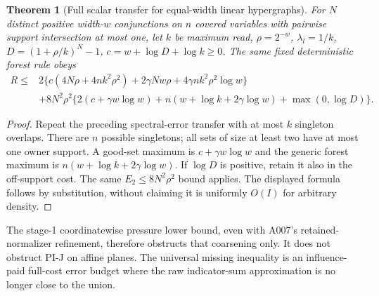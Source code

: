 \documentclass[11pt]{article}
\newtheorem{theorem}{Theorem}
\begin{document}
\begin{theorem}[Full scalar transfer for equal-width linear hypergraphs]
For $N$ distinct positive width-$w$ conjunctions on $n$ covered
variables with pairwise support intersection at most one, let $k$ be
maximum read, $\rho=2^{-w}$, $\lambda_l=1/k$,
$D=(1+\rho/k)^N-1$, $c=w+\log D+\log k\ge0$.
The same fixed deterministic forest rule obeys
\begin{align*}
 R\le{}&2\{c(4N\rho+4nk^2\rho^2)+2\gamma Nw\rho
              +4\gamma nk^2\rho^2\log w\}\\
 &+8N^2\rho^2\{2(c+\gamma w\log w)
       +n(w+\log k+2\gamma\log w)+\max(0,\log D)\}.
\end{align*}
\end{theorem}
\begin{proof}
Repeat the preceding spectral-error transfer with at most $k$
singleton overlaps. There are $n$ possible singletons; all sets of
size at least two have at most one owner support. A good-set maximum
is $c+\gamma w\log w$ and the generic forest maximum is
$n(w+\log k+2\gamma\log w)$. If $\log D$ is positive, retain it also
in the off-support cost. The same $E_2\le8N^2\rho^2$ bound applies.
The displayed formula follows by substitution, without claiming it
is uniformly $O(I)$ for arbitrary density.
\end{proof}
The stage-1 coordinatewise pressure lower bound, even with A007's
retained-normalizer refinement, therefore obstructs that coarsening
only. It does not obstruct PI-J on affine planes. The universal
missing inequality is an influence-paid full-cost error budget where
the raw indicator-sum approximation is no longer close to the union.
\end{document}
